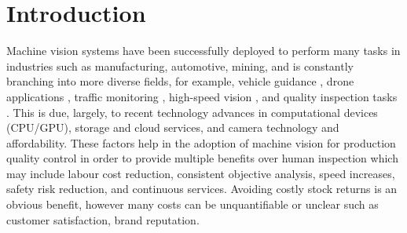 \documentclass[fleqn,twoside]{article}
\renewcommand{\baselinestretch}{1.5}
\begin{document}



\renewcommand{\baselinestretch}{0.5} 
\printnomenclature

\renewcommand{\baselinestretch}{1.5} 



\newpage

\section{Introduction}

Machine vision systems have been successfully deployed to perform many tasks in industries such as manufacturing, automotive, mining, and is constantly branching into more diverse fields, for example, vehicle guidance \cite{menze,urmson}, drone applications \cite{greene,boucher}, traffic monitoring \cite{cheung,kamijo}, high-speed vision \cite{watanabe,nakabo}, and quality inspection tasks \cite{cubero, du}. This is due, largely, to recent technology advances in computational devices (CPU/GPU), storage and cloud services, and camera technology and affordability. These factors help in the adoption of machine vision for production quality control in order to provide multiple benefits over human inspection which may include labour cost reduction, consistent objective analysis, speed increases, safety risk reduction, and continuous services. Avoiding costly stock returns is an obvious benefit, however many costs can be unquantifiable or unclear such as customer satisfaction, brand reputation.
\end{document}
